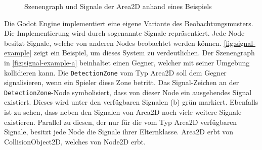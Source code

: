 \begin{figure}[H]%
	\centering
	\qquad
	\caption{Szenengraph und Signale der Area2D anhand eines Beispiels}%
	\label{fig:signal-example}%
\end{figure}

Die Godot Engine implementiert eine eigene Variante des Beobachtungsmusters\cite{godot-signals}\cite[293]{design-patterns-gof}.
Die Implementierung wird durch sogenannte Signale repräsentiert.
Jede Node besitzt Signale, welche von anderen Nodes beobachtet werden können.
\autoref{fig:signal-example} zeigt ein Beispiel, um dieses System zu verdeutlichen.
Der Szenengraph in \autoref{fig:signal-example-a} beinhaltet einen Gegner, welcher mit seiner Umgebung kollidieren kann.
Die \texttt{DetectionZone} vom Typ Area2D soll dem Gegner signalisieren, wenn ein Spieler diese Zone betritt.
Das Signal-Zeichen an der \texttt{DetectionZone}-Node symbolisiert, dass von dieser Node ein ausgehendes Signal existiert.
Dieses wird unter den verfügbaren Signalen (b) grün markiert. Ebenfalls ist zu sehen, dass neben den Signalen von Area2D noch viele weitere Signale existieren.
Parallel zu diesen, der nur für die vom Typ Area2D verfügbaren Signale, besitzt jede Node die Signale ihrer Elternklasse.
Area2D erbt von CollisionObject2D, welches von Node2D erbt. \\

